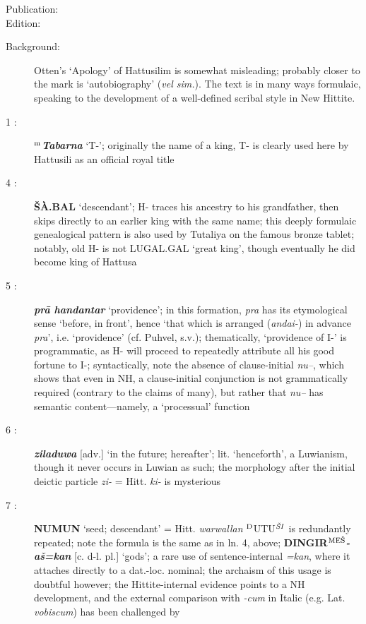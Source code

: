 \documentclass[10pt]{article}
\newcommand{\supersc}[1]{$^{\textrm{\scriptsize{#1}}}$}  	%
\newcommand{\bit}[1]{\textbf{\textit{#1}}}				%
\newcommand{\p}[1]{{\tiny[{#1}]}}					%
\newcommand{\hith}{\textsubwedge{h}}
\newcommand{\mpl}{\supersc{ME\v{S}}}
\renewcommand{\.}[1]{\textsubdot{#1}}
\begin{document}
\begin{description}

\item[Publication:] 
\item[Edition:] \citet{otten1981hattusili}
\item[Background:] Otten's `Apology' of Hattusilim is somewhat misleading; probably closer to the mark is `autobiography' (\textit{vel sim.}). The text is in many ways formulaic, speaking to the development of a well-defined scribal style in New Hittite.

\smallskip

\item[1 :] \textbf{\supersc{m}}\bit{Tabarna} `T-'; originally the name of a king, T- is clearly used here by Hattusili as an official royal title

\item[4 :] \textbf{\v{S}\`A.BAL} `descendant'; H- traces his ancestry to his grandfather, then skips directly to an earlier king with the same name; this deeply formulaic genealogical pattern is also used by Tut{\hith}aliya on the famous bronze tablet; notably, old H- is not LUGAL.GAL `great king', though eventually he did become king of Hattusa

\item[5 :] \bit{pr\=a handantar} `providence'; in this formation, \textit{pra} has its etymological sense `before, in front', hence `that which is arranged (\textit{{\hith}andai-}) in advance \textit{pra}', i.e. `providence' (cf. Puhvel, s.v.); thematically, `providence of I-' is programmatic, as H- will proceed to repeatedly attribute all his good fortune to I-; syntactically, note the absence of clause-initial \textit{nu--}, which shows that even in NH, a clause-initial conjunction is not grammatically required (contrary to the claims of many), but rather that \textit{nu--} has semantic content---namely, a `processual' function

\item[6 :] \bit{ziladuwa} \p{adv.} `in the future; hereafter'; lit. `henceforth', a Luwianism, though it never occurs in Luwian as such; the morphology after the initial deictic particle \textit{zi-} = Hitt. \textit{ki-} is mysterious

\item[7 :] \textbf{NUMUN} `seed; descendant' = Hitt. \textit{warwallan} \supersc{D}UTU\supersc{\textit{\v{S}I}} is redundantly repeated; note the formula is the same as in ln. 4, above; \textbf{DINGIR{\mpl}}\bit{-a\v{s}=kan} \p{c. d-l. pl.} `gods'; a rare use of sentence-internal \textit{=kan}, where it attaches directly to a dat.-loc. nominal; the archaism of this usage is doubtful however; the Hittite-internal evidence points to a NH development, and the external comparison with \textit{-cum} in Italic (e.g. Lat. \textit{vobiscum}) has been challenged by \citet{fortson2010kan}


\end{description}
\end{document}
